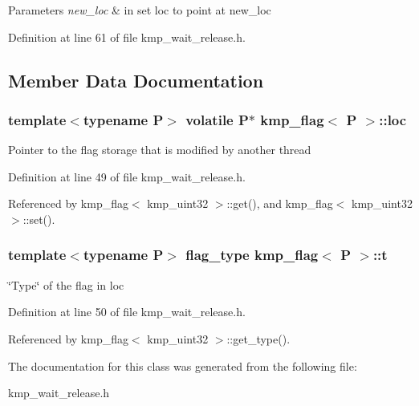 \begin{DoxyParams}{Parameters}
{\em new\-\_\-loc} & in set loc to point at new\-\_\-loc \\
\hline
\end{DoxyParams}


Definition at line 61 of file kmp\-\_\-wait\-\_\-release.\-h.



\subsection{Member Data Documentation}
\hypertarget{classkmp__flag_a5d89de3bda829ab9be324007d915aa3b}{
\subsubsection[{loc}]{\setlength{\rightskip}{0pt plus 5cm}template$<$typename P$>$ volatile P$\ast$ {\bf kmp\-\_\-flag}$<$ P $>$\-::loc\hspace{0.3cm}{\ttfamily [private]}}}\label{classkmp__flag_a5d89de3bda829ab9be324007d915aa3b}
Pointer to the flag storage that is modified by another thread 

Definition at line 49 of file kmp\-\_\-wait\-\_\-release.\-h.



Referenced by kmp\-\_\-flag$<$ kmp\-\_\-uint32 $>$\-::get(), and kmp\-\_\-flag$<$ kmp\-\_\-uint32 $>$\-::set().

\hypertarget{classkmp__flag_aebad8727c9520d1bb2b2219c94cb3c62}{
\subsubsection[{t}]{\setlength{\rightskip}{0pt plus 5cm}template$<$typename P$>$ {\bf flag\-\_\-type} {\bf kmp\-\_\-flag}$<$ P $>$\-::t\hspace{0.3cm}{\ttfamily [private]}}}\label{classkmp__flag_aebad8727c9520d1bb2b2219c94cb3c62}
\char`\"{}\-Type\char`\"{} of the flag in loc 

Definition at line 50 of file kmp\-\_\-wait\-\_\-release.\-h.



Referenced by kmp\-\_\-flag$<$ kmp\-\_\-uint32 $>$\-::get\-\_\-type().



The documentation for this class was generated from the following file\-:\begin{DoxyCompactItemize}
\item 
kmp\-\_\-wait\-\_\-release.\-h\end{DoxyCompactItemize}

